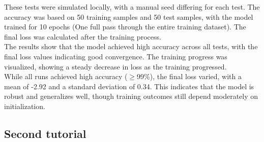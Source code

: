 \documentclass[conference]{IEEEtran}
\begin{document}
\noindent
These tests were simulated locally, with a manual seed differing for each test. The accuracy was based on 50 training samples and 50 test samples, with the model trained for 10 epochs (One full pass through the entire training dataset). The final loss was calculated after the training process.\\
The results show that the model achieved high accuracy across all tests, with the final loss values indicating good convergence. The training progress was visualized, showing a steady decrease in loss as the training progressed.\\
While all runs achieved high accuracy ($\geq$99\%), the final loss varied, with a mean of -2.92 and a standard deviation of 0.34. This indicates that the model is robust and generalizes well, though training outcomes still depend moderately on initialization.


\subsection*{\fontsize{12}{16}\selectfont Second tutorial}
\end{document}
